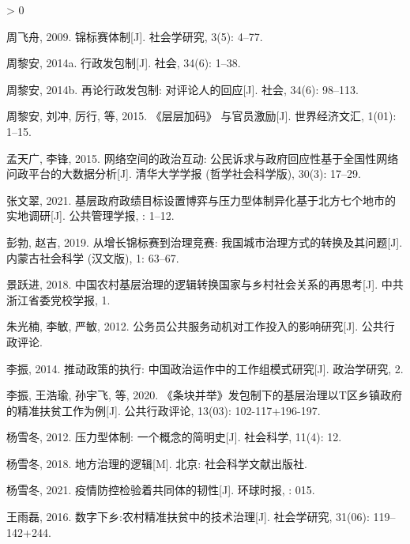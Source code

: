 \documentclass[
  12pt,
]{ctexart}
\newlength{\cslhangindent}
\newenvironment{CSLReferences}[2] %
 {%
  \setlength{\parindent}{0pt}
  \ifodd #1 \everypar{\setlength{\hangindent}{\cslhangindent}}\ignorespaces\fi
  \ifnum #2 > 0
  \setlength{\parskip}{#2\baselineskip}
  \fi
 }%
 {}
\begin{document}
\begin{CSLReferences}{1}{0}
\leavevmode\hypertarget{ref-ZhouFeiZhou2009}{}%
周飞舟, 2009. 锦标赛体制{[}J{]}. 社会学研究, 3(5): 4--77.

\leavevmode\hypertarget{ref-ZhouLiAn2014}{}%
周黎安, 2014a. 行政发包制{[}J{]}. 社会, 34(6): 1--38.

\leavevmode\hypertarget{ref-ZhouLiAn2014a}{}%
周黎安, 2014b. 再论行政发包制: 对评论人的回应{[}J{]}. 社会, 34(6): 98--113.

\leavevmode\hypertarget{ref-ZhouLiAnEtAl2015}{}%
周黎安, 刘冲, 厉行, 等, 2015. {《层层加码》} 与官员激励{[}J{]}. 世界经济文汇, 1(01): 1--15.

\leavevmode\hypertarget{ref-MengTianGuangLiFeng2015}{}%
孟天广, 李锋, 2015. 网络空间的政治互动: 公民诉求与政府回应性{}{}基于全国性网络问政平台的大数据分析{[}J{]}. 清华大学学报 (哲学社会科学版), 30(3): 17--29.

\leavevmode\hypertarget{ref-ZhangWenCui2021}{}%
张文翠, 2021. 基层政府政绩目标设置博弈与压力型体制异化{}{}基于北方七个地市的实地调研{[}J{]}. 公共管理学报, : 1--12.

\leavevmode\hypertarget{ref-PengBoZhaoJi2019}{}%
彭勃, 赵吉, 2019. 从增长锦标赛到治理竞赛: 我国城市治理方式的转换及其问题{[}J{]}. 内蒙古社会科学 (汉文版), 1: 63--67.

\leavevmode\hypertarget{ref-JingYueJin2018}{}%
景跃进, 2018. 中国农村基层治理的逻辑转换{}{}国家与乡村社会关系的再思考{[}J{]}. 中共浙江省委党校学报, 1.

\leavevmode\hypertarget{ref-ZhuGuangNanEtAl2012}{}%
朱光楠, 李敏, 严敏, 2012. 公务员公共服务动机对工作投入的影响研究{[}J{]}. 公共行政评论.

\leavevmode\hypertarget{ref-LiZhen2014}{}%
李振, 2014. 推动政策的执行: 中国政治运作中的工作组模式研究{[}J{]}. 政治学研究, 2.

\leavevmode\hypertarget{ref-LiZhenEtAl2020c}{}%
李振, 王浩瑜, 孙宇飞, 等, 2020. {《条块并举》}发包制下的基层治理{}{{以T区乡镇政府的精准扶贫工作为例}}{[}J{]}. 公共行政评论, 13(03): 102-117+196-197.

\leavevmode\hypertarget{ref-YangXueDong2012}{}%
杨雪冬, 2012. 压力型体制: 一个概念的简明史{[}J{]}. 社会科学, 11(4): 12.

\leavevmode\hypertarget{ref-YangXueDong2018}{}%
杨雪冬, 2018. {地方治理的逻辑}{[}M{]}. {北京}: {社会科学文献出版社}.

\leavevmode\hypertarget{ref-YangXueDong2021}{}%
杨雪冬, 2021. 疫情防控检验着共同体的韧性{[}J{]}. 环球时报, : 015.

\leavevmode\hypertarget{ref-WangYuLei2016}{}%
王雨磊, 2016. 数字下乡:农村精准扶贫中的技术治理{[}J{]}. 社会学研究, 31(06): 119--142+244.


\end{CSLReferences}
\end{document}
